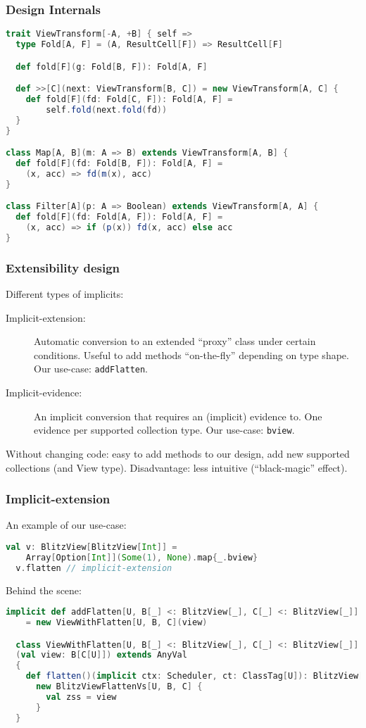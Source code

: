 \documentclass[12pt]{beamer}
\begin{document}
\begin{frame}[fragile]
    \frametitle{Design Internals}
    \begin{lstlisting}[language=scala, basicstyle=\tiny]
trait ViewTransform[-A, +B] { self =>
  type Fold[A, F] = (A, ResultCell[F]) => ResultCell[F]

  def fold[F](g: Fold[B, F]): Fold[A, F]

  def >>[C](next: ViewTransform[B, C]) = new ViewTransform[A, C] {
    def fold[F](fd: Fold[C, F]): Fold[A, F] =
        self.fold(next.fold(fd))
  }
}

class Map[A, B](m: A => B) extends ViewTransform[A, B] {
  def fold[F](fd: Fold[B, F]): Fold[A, F] =
    (x, acc) => fd(m(x), acc)
}

class Filter[A](p: A => Boolean) extends ViewTransform[A, A] {
  def fold[F](fd: Fold[A, F]): Fold[A, F] =
    (x, acc) => if (p(x)) fd(x, acc) else acc
}
    \end{lstlisting}
\end{frame}

\begin{frame}
    \frametitle{Extensibility design}
    Different types of implicits:
    \begin{description}
        \item[Implicit-extension:] Automatic conversion to an extended ``proxy'' class under certain conditions.
            Useful to add methods ``on-the-fly'' depending on type shape.
            Our use-case: {\tt addFlatten}.
        \item[Implicit-evidence:] An implicit conversion that requires an (implicit) evidence to.
            One evidence per supported collection type.
            Our use-case: {\tt bview}.
    \end{description}
    Without changing code: easy to add methods to our design, add new supported collections (and View type).
    Disadvantage: less intuitive (``black-magic'' effect).
\end{frame}

\begin{frame}[fragile]
    \frametitle{Implicit-extension}
    An example of our use-case:
    \begin{lstlisting}[language=scala, basicstyle=\tiny]
  val v: BlitzView[BlitzView[Int]] =
    Array[Option[Int]](Some(1), None).map{_.bview}
  v.flatten // implicit-extension
    \end{lstlisting}

    Behind the scene:
    \begin{lstlisting}[language=scala, basicstyle=\tiny]
  implicit def addFlatten[U, B[_] <: BlitzView[_], C[_] <: BlitzView[_]](view: B[C[U]])
    = new ViewWithFlatten[U, B, C](view)

  class ViewWithFlatten[U, B[_] <: BlitzView[_], C[_] <: BlitzView[_]]
  (val view: B[C[U]]) extends AnyVal
  {
    def flatten()(implicit ctx: Scheduler, ct: ClassTag[U]): BlitzView[U] =
      new BlitzViewFlattenVs[U, B, C] {
        val zss = view
      }
  }
    \end{lstlisting}
\end{frame}
\end{document}
